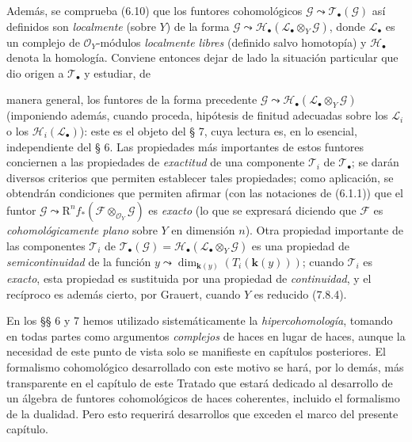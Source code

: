 \begin{env}[6.1.2]
\label{III.6.1.2}
Además, se comprueba (6.10) que los funtores cohomológicos
$\mathscr G\leadsto\mathscr T_\bullet(\mathscr G)$ así definidos son
\emph{localmente} (sobre $Y$) de la forma
$\mathscr G\leadsto\mathscr H_\bullet(\mathscr L_\bullet\otimes_Y\mathscr G)$,
donde $\mathscr L_\bullet$ es un complejo de $\mathscr O_Y$-módulos
\emph{localmente libres} (definido salvo homotopía) y $\mathscr H_\bullet$ denota la
homología. Conviene entonces dejar de lado la situación particular que dio
origen a $\mathscr T_\bullet$ y estudiar, de


manera general, los funtores de la forma precedente
$\mathscr G\leadsto\mathscr H_\bullet(\mathscr L_\bullet\otimes_Y\mathscr G)$
(imponiendo además, cuando proceda, hipótesis de finitud adecuadas sobre los
$\mathscr L_i$ o los $\mathscr H_i(\mathscr L_\bullet)$): este es el objeto
del § 7, cuya lectura es, en lo esencial, independiente del § 6. Las
propiedades más importantes de estos funtores conciernen a las propiedades de
\emph{exactitud} de una componente $\mathscr T_i$ de $\mathscr T_\bullet$; se darán
diversos criterios que permiten establecer tales propiedades; como
aplicación, se obtendrán condiciones que permiten afirmar (con las notaciones
de (6.1.1)) que el funtor
$\mathscr G\leadsto\mathrm R^n f_*(\mathscr F\otimes_{\mathscr O_Y}\mathscr G)$
es \emph{exacto} (lo que se expresará diciendo que $\mathscr F$ es
\emph{cohomológicamente plano} sobre $Y$ en dimensión $n$). Otra propiedad
importante de las componentes $\mathscr T_i$ de
$\mathscr T_\bullet(\mathscr G)=
\mathscr H_\bullet(\mathscr L_\bullet\otimes_Y\mathscr G)$ es una propiedad
de \emph{semicontinuidad} de la función
$y\leadsto\dim_{\boldsymbol{k}(y)}(T_i(\boldsymbol{k}(y)))$; cuando $\mathscr T_i$ es \emph{exacto}, esta
propiedad es sustituida por una propiedad de \emph{continuidad}, y el recíproco es
además cierto, por Grauert, cuando $Y$ es reducido (7.8.4).
\end{env}

\begin{env}[6.1.3]
\label{III.6.1.3}
En los §§ 6 y 7 hemos utilizado sistemáticamente la \emph{hipercohomología}, tomando
en todas partes como argumentos \emph{complejos} de haces en lugar de haces, aunque
la necesidad de este punto de vista solo se manifieste en capítulos
posteriores. El formalismo cohomológico desarrollado con este motivo se hará,
por lo demás, más transparente en el capítulo de este Tratado que estará
dedicado al desarrollo de un álgebra de funtores cohomológicos de haces
coherentes, incluido el formalismo de la dualidad. Pero esto requerirá
desarrollos que exceden el marco del presente capítulo.
\end{env}

